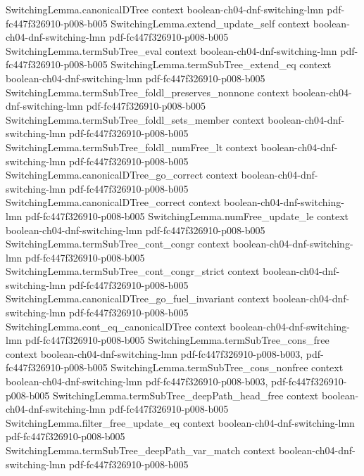 \begin{theorem}
\proofstep
  {SwitchingLemma.canonicalDTree}
  {context}
  {boolean-ch04-dnf-switching-lmn}
  {pdf-fc447f326910-p008-b005}
\proofstep
  {SwitchingLemma.extend_update_self}
  {context}
  {boolean-ch04-dnf-switching-lmn}
  {pdf-fc447f326910-p008-b005}
\proofstep
  {SwitchingLemma.termSubTree_eval}
  {context}
  {boolean-ch04-dnf-switching-lmn}
  {pdf-fc447f326910-p008-b005}
\proofstep
  {SwitchingLemma.termSubTree_extend_eq}
  {context}
  {boolean-ch04-dnf-switching-lmn}
  {pdf-fc447f326910-p008-b005}
\proofstep
  {SwitchingLemma.termSubTree_foldl_preserves_nonnone}
  {context}
  {boolean-ch04-dnf-switching-lmn}
  {pdf-fc447f326910-p008-b005}
\proofstep
  {SwitchingLemma.termSubTree_foldl_sets_member}
  {context}
  {boolean-ch04-dnf-switching-lmn}
  {pdf-fc447f326910-p008-b005}
\proofstep
  {SwitchingLemma.termSubTree_foldl_numFree_lt}
  {context}
  {boolean-ch04-dnf-switching-lmn}
  {pdf-fc447f326910-p008-b005}
\proofstep
  {SwitchingLemma.canonicalDTree_go_correct}
  {context}
  {boolean-ch04-dnf-switching-lmn}
  {pdf-fc447f326910-p008-b005}
\proofstep
  {SwitchingLemma.canonicalDTree_correct}
  {context}
  {boolean-ch04-dnf-switching-lmn}
  {pdf-fc447f326910-p008-b005}
\proofstep
  {SwitchingLemma.numFree_update_le}
  {context}
  {boolean-ch04-dnf-switching-lmn}
  {pdf-fc447f326910-p008-b005}
\proofstep
  {SwitchingLemma.termSubTree_cont_congr}
  {context}
  {boolean-ch04-dnf-switching-lmn}
  {pdf-fc447f326910-p008-b005}
\proofstep
  {SwitchingLemma.termSubTree_cont_congr_strict}
  {context}
  {boolean-ch04-dnf-switching-lmn}
  {pdf-fc447f326910-p008-b005}
\proofstep
  {SwitchingLemma.canonicalDTree_go_fuel_invariant}
  {context}
  {boolean-ch04-dnf-switching-lmn}
  {pdf-fc447f326910-p008-b005}
\proofstep
  {SwitchingLemma.cont_eq_canonicalDTree}
  {context}
  {boolean-ch04-dnf-switching-lmn}
  {pdf-fc447f326910-p008-b005}
\proofstep
  {SwitchingLemma.termSubTree_cons_free}
  {context}
  {boolean-ch04-dnf-switching-lmn}
  {pdf-fc447f326910-p008-b003,
    pdf-fc447f326910-p008-b005}
\proofstep
  {SwitchingLemma.termSubTree_cons_nonfree}
  {context}
  {boolean-ch04-dnf-switching-lmn}
  {pdf-fc447f326910-p008-b003,
    pdf-fc447f326910-p008-b005}
\proofstep
  {SwitchingLemma.termSubTree_deepPath_head_free}
  {context}
  {boolean-ch04-dnf-switching-lmn}
  {pdf-fc447f326910-p008-b005}
\proofstep
  {SwitchingLemma.filter_free_update_eq}
  {context}
  {boolean-ch04-dnf-switching-lmn}
  {pdf-fc447f326910-p008-b005}
\proofstep
  {SwitchingLemma.termSubTree_deepPath_var_match}
  {context}
  {boolean-ch04-dnf-switching-lmn}
  {pdf-fc447f326910-p008-b005}
\proofstep

\end{theorem}
